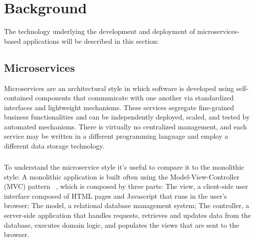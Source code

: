 
%

\chapter{Background}
\label{cha:background}

The technology underlying the development and deployment of microservices-based applications will be described in this section:

\section{Microservices} %
\label{sec:microservices}

Microservices \cite{microservices, microservices2017tenets, microservicesTomorrow} are an architectural style in which software is developed using self-contained components that
communicate with one another via standardized interfaces and lightweight mechanisms.
These services segregate fine-grained business functionalities and can be independently deployed, scaled, and tested by automated mechanisms.
There is virtually no centralized management, and each service may be written in a different programming language and employ a different data storage technology.

\paragraph{}

To understand the microservice style it's useful to compare it to the monolithic style:
A monolithic application is built often using the Model-View-Controller (MVC) pattern ~\cite{mvc}, which is composed by three parts:
The view, a client-side user interface composed of HTML pages and Javascript that runs in the user's browser;
The model, a relational database management system;
The controller, a server-side application that handles requests, retrieves and updates data from the database, executes domain logic,
and populates the views that are sent to the browser.

\paragraph{}

